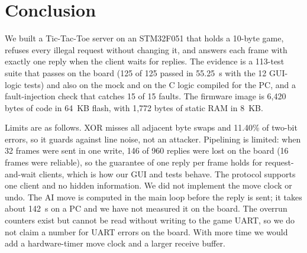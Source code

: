 \section{Conclusion}
\label{sec:conclusion}

We built a Tic-Tac-Toe server on an STM32F051 that holds a 10-byte game, refuses every illegal request without changing it,
and answers each frame with exactly one reply when the client waits for replies. The evidence is a 113-test suite that passes on the board (125 of 125 passed in 55.25~s with the 12 GUI-logic tests) and also on the mock and on the C logic compiled for the PC, and a
fault-injection check that catches 15 of 15 faults. The firmware image is 6{,}420 bytes of code in 64~KB flash, with 1{,}772 bytes of static RAM in 8~KB.

Limits are as follows. XOR misses all adjacent byte swaps and 11.40\% of two-bit errors, so it guards against line noise, not an attacker. Pipelining is limited: when 32 frames were sent in one write, 146 of 960 replies were lost on the board (16 frames were reliable), so the guarantee of one reply per frame holds for request-and-wait clients, which is how our GUI and tests behave. The protocol supports one client and
no hidden information. We did not implement the move clock or undo. The AI move is computed in the main loop before the reply is sent; it takes about 142~\textmu s on a PC and we have not measured it on the board. The overrun counters exist but cannot be read without writing to the game UART, so
we do not claim a number for UART errors on the board. With more time we would add a hardware-timer move clock and a larger receive buffer.
